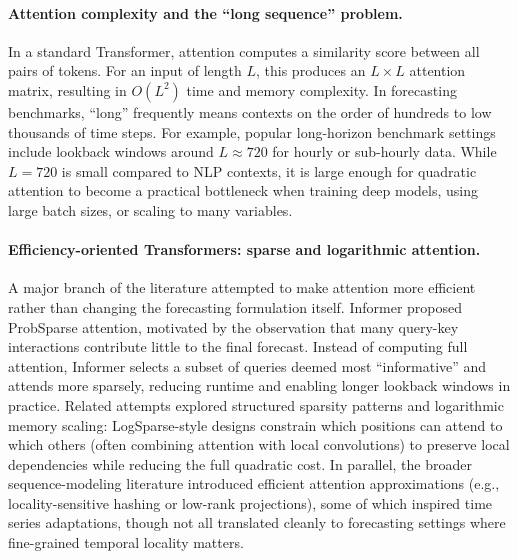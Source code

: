 \paragraph{Attention complexity and the ``long sequence'' problem.}
In a standard Transformer, attention computes a similarity score between all pairs of tokens. For an input of length $L$, this produces an $L \times L$ attention matrix, resulting in $O(L^2)$ time and memory complexity. In forecasting benchmarks, ``long'' frequently means contexts on the order of hundreds to low thousands of time steps. For example, popular long-horizon benchmark settings include lookback windows around $L \approx 720$ for hourly or sub-hourly data. While $L=720$ is small compared to NLP contexts, it is large enough for quadratic attention to become a practical bottleneck when training deep models, using large batch sizes, or scaling to many variables.

\paragraph{Efficiency-oriented Transformers: sparse and logarithmic attention.}
A major branch of the literature attempted to make attention more efficient rather than changing the forecasting formulation itself. Informer proposed ProbSparse attention, motivated by the observation that many query-key interactions contribute little to the final forecast. Instead of computing full attention, Informer selects a subset of queries deemed most ``informative'' and attends more sparsely, reducing runtime and enabling longer lookback windows in practice. Related attempts explored structured sparsity patterns and logarithmic memory scaling: LogSparse-style designs constrain which positions can attend to which others (often combining attention with local convolutions) to preserve local dependencies while reducing the full quadratic cost. In parallel, the broader sequence-modeling literature introduced efficient attention approximations (e.g., locality-sensitive hashing or low-rank projections), some of which inspired time series adaptations, though not all translated cleanly to forecasting settings where fine-grained temporal locality matters.

